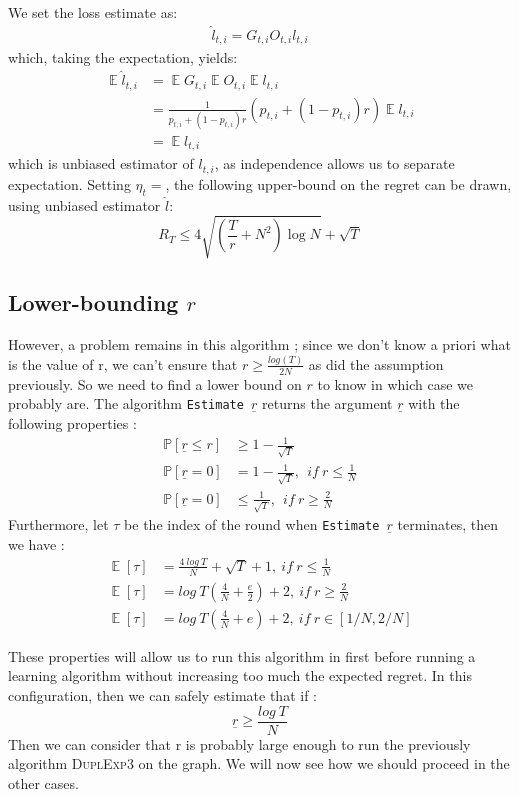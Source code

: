 \documentclass[11pt,a4paper]{article}
\DeclareMathOperator*{\expect}{\mathbb{E}}
\begin{document}
We set the loss estimate as:
\begin{align*}
\hat{l}_{t,i}=G_{t,i}O_{t,i}l_{t,i}
\end{align*}
which, taking the expectation, yields:
\begin{align*}
\expect{\hat{l}_{t,i}}&=\expect{G_{t,i}}\expect{O_{t,i}}\expect{l_{t,i}} \\
&= \frac{1}{p_{t,i}+(1-p_{t,i})r} \left(p_{t,i}+(1-p_{t,i})r\right) \expect{l_{t,i}} \\
&= \expect{l_{t,i}}
\end{align*}
which is unbiased estimator of $l_{t,i}$, as independence allows us to separate expectation. Setting $\eta_t = $, the following upper-bound on the regret can be drawn, using unbiased estimator $\hat l$:
\[
R_T \leq 4 \sqrt{\left(\frac{T}{r}+N^2\right)\log N}+\sqrt{T}
\]
\subsection{Lower-bounding $r$}
However, a problem remains in this algorithm ; since we don't know a priori what is the value of r, we can't ensure that $ r\geq \frac{log(T)}{2N}$ as did the assumption previously. So we need to find a lower bound on $r$ to know in which case we probably are. The algorithm \verb|Estimate |$\underline{r}$ returns the argument $\underline{r}$ with the following properties : 
\begin{align*}
\mathbb{P} [\underline{r}\leq r]&\geq 1-\frac{1}{\sqrt{T}}\\
\mathbb{P} [\underline{r}=0]&=1-\frac{1}{\sqrt{T}},\ \ if\ r\leq \frac{1}{N}\\
\mathbb{P} [\underline{r}=0]&\leq \frac{1}{\sqrt{T}},\ \ if\ r\geq \frac{2}{N}
\end{align*}
Furthermore, let $\tau$ be the index of the round when \verb|Estimate |$\underline{r}$ terminates, then we have :
\begin{align*}
\expect{[\tau]} & = \frac{4\ log\ T}{N}+\sqrt{T}+1,\ if\ r \leq \frac{1}{N}\\
\expect{[\tau]} & = log\ T \left( \frac{4}{N} + \frac{e}{2} \right) + 2,\ if\ r\geq \frac{2}{N}\\
\expect{[\tau]} & = log\ T \left( \frac{4}{N} + e \right) + 2,\ if\ r \in [1/N,2/N]
\end{align*}

These properties will allow us to run this algorithm in first before running a learning algorithm without increasing too much the expected regret. In this configuration, then we can safely estimate that if :
$$ \underline{r} \geq \frac{log\ T}{N} $$
Then we can consider that r is probably large enough to run the previously algorithm \textsc{DuplExp3} on the graph. We will now see how we should proceed in the other cases.
\end{document}
